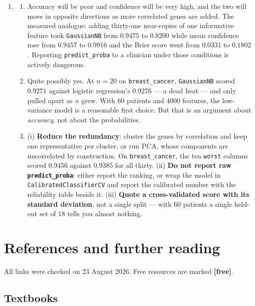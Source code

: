 \documentclass[11pt]{article}
\begin{document}
\begin{enumerate}[leftmargin=*, itemsep=0.7em]
\item
  \begin{enumerate}[label=(\alph*)]
    \item Accuracy will be poor and confidence will be very high, and the two
      will move in opposite directions as more correlated genes are added.
      The measured analogue: adding thirty-one near-copies of one informative
      feature took \texttt{GaussianNB} from $0.9475$ to $\mathbf{0.8200}$
      while mean confidence rose from $0.9457$ to $\mathbf{0.9916}$ and the
      Brier score went from $0.0331$ to $0.1802$. Reporting
      \texttt{predict\_proba} to a clinician under those conditions is
      actively dangerous.
    \item Quite possibly yes. At $n = 20$ on \texttt{breast\_cancer},
      \texttt{GaussianNB} scored $0.9271$ against logistic regression's
      $0.9276$ --- a dead heat --- and only pulled apart as $n$ grew. With
      $60$ patients and $4000$ features, the low-variance model is a
      reasonable first choice. But that is an argument about \emph{accuracy},
      not about the probabilities.
    \item (i) \textbf{Reduce the redundancy}: cluster the genes by
      correlation and keep one representative per cluster, or run PCA, whose
      components are uncorrelated by construction. On
      \texttt{breast\_cancer}, the ten \texttt{worst} columns scored
      $0.9456$ against $0.9385$ for all thirty. (ii) \textbf{Do not report
      raw \texttt{predict\_proba}}: either report the ranking, or wrap the
      model in \texttt{CalibratedClassifierCV} and report the calibrated
      number with the reliability table beside it. (iii) \textbf{Quote a
      cross-validated score with its standard deviation}, not a single split
      --- with $60$ patients a single held-out set of $18$ tells you almost
      nothing.
  \end{enumerate}

\end{enumerate}

\section{References and further reading}
\label{sec:refs}

All links were checked on 23 August 2026. Free resources are marked
\textbf{[free]}.

\subsection*{Textbooks}
\end{document}
